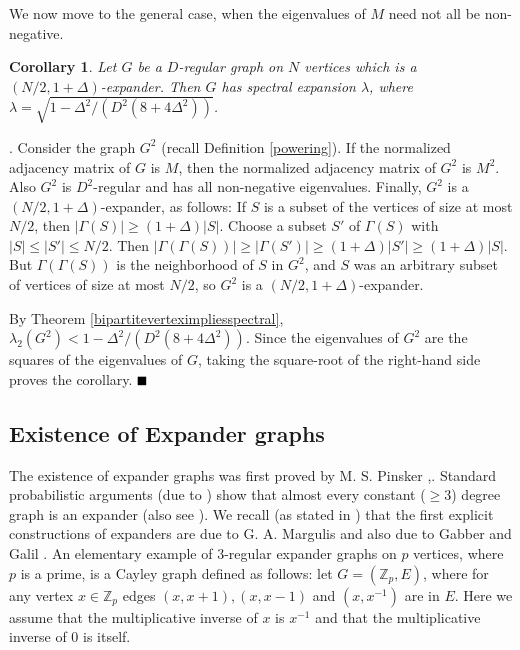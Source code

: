 \documentclass{article}
\newtheorem{corollary}[theorem]{Corollary}
\newcommand{\bproof}{\noindent{\bf Proof}}
\newcommand{\eproof}{\hspace*{\fill}$\rule{2mm}{2mm}$~~~~\bigskip}
\renewenvironment{proof}{\bproof. }{\eproof}
\newcommand{\Z}{\mathbb{Z}}
\begin{document}
We now move to the general case, when the eigenvalues of $M$ need not all be non-negative.
\begin{corollary}
Let $G$ be a $D$-regular graph on $N$ vertices which is a $(N/2,1+\Delta )$-expander. Then $G$ has spectral expansion $\lambda$, where $\lambda =\sqrt{1-\Delta^2/(D^2(8+4\Delta^2))}$.
\end{corollary}
\begin{proof}
Consider the graph $G^2$ (recall Definition \ref{powering}). If the normalized adjacency matrix of $G$ is $M$, then the normalized adjacency matrix of $G^2$ is $M^2$. Also $G^2$ is $D^2$-regular and has all non-negative eigenvalues. Finally, $G^2$ is a $(N/2,1+\Delta )$-expander, as follows: If $S$ is a subset of the vertices of size at most $N/2$, then $|\Gamma (S)|\geq (1+\Delta )|S|$. Choose a subset $S'$ of $\Gamma (S)$ with $|S|\leq |S'|\leq N/2$. Then $|\Gamma (\Gamma (S))|\geq |\Gamma (S')|\geq (1+\Delta )|S'|\geq (1+\Delta )|S|$. But $\Gamma (\Gamma (S))$ is the neighborhood of $S$ in $G^2$, and $S$ was an arbitrary subset of vertices of size at most $N/2$, so $G^2$ is a $(N/2,1+\Delta )$-expander.

By Theorem \ref{bipartiteverteximpliesspectral}, $\lambda_2(G^2)<1-\Delta^2/(D^2(8+4\Delta^2))$. Since the eigenvalues of $G^2$ are the squares of the eigenvalues of $G$, taking the square-root of the right-hand side proves the corollary.
\end{proof}

\subsection{Existence of Expander graphs}
The existence of expander graphs was first proved by M. S. Pinsker \cite{Pin1973},\cite[pp.152]{AS2016}. Standard probabilistic arguments (due to \cite{Pin1973}) show that almost every constant ($\geq 3$) degree graph is an expander (also see \cite[Theorem 2]{ASS2008}). We recall (as stated in \cite[pp. 343]{JM1987}) that the first explicit constructions of expanders are due to G. A. Margulis and also due to Gabber and Galil \cite{GG1981}. An elementary example of $3$-regular expander graphs on $p$ vertices, where $p$ is a prime, is a Cayley graph defined as follows: let $G=(\Z_p,E)$, where for any vertex $x\in\Z_p$ edges $(x,x+1),(x,x-1)$ and $(x,x^{-1})$ are in $E$. Here we assume that the multiplicative inverse of $x$ is $x^{-1}$ and that the multiplicative inverse of $0$ is itself.
\end{document}
